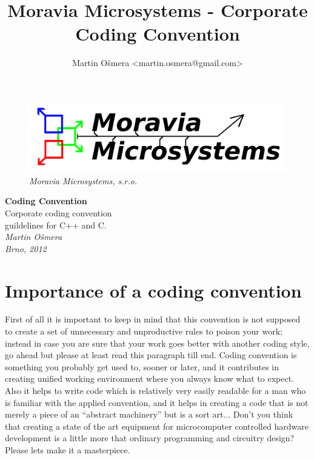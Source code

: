 \documentclass[a4paper,twoside,15pt]{book}
\title{Moravia Microsystems - Corporate Coding Convention}
\author{Martin Ošmera <martin.osmera@gmail.com>}
\begin{document}
\begin{titlepage}
        \begin{figure}[ht!]
                \centering{}
                \includegraphics[width=.9\textwidth]{Moravia_Microsystems.png}
                \caption{\textit{Moravia Microsystems, s.r.o.}}
        \end{figure}
        \begin{center}
                \fontsize{35.83pt}{60pt} \selectfont{}
                \textbf{Coding Convention}
                \\[2cm]
                \fontsize{25pt}{30pt} \selectfont{}
                Corporate coding convention\\
                guildelines for C++ and C.
                \\[1cm]
                \fontsize{14.4pt}{20pt} \selectfont{}
                \textit{Martin Ošmera\\Brno, 2012}
        \end{center}
\end{titlepage}

\tableofcontents

\chapter{Importance of a coding convention}
	First of all it is important to keep in mind that this convention is not supposed to create a set of unnecessary and unproductive rules to poison your work; instead in case you are sure that your work goes better with another coding style, go ahead but please at least read this paragraph till end. Coding convention is something you probably get used to, sooner or later, and it contributes in creating unified working environment where you always know what to expect. Also it helps to write code which is relatively very easily readable for a man who is familiar with the applied convention, and it helps in creating a code that is not merely a piece of an ``abstract machinery'' but is a sort art... Don't you think that creating a state of the art equipment for microcomputer controlled hardware development is a little more that ordinary programming and circuitry design? Please lets make it a masterpiece.
\end{document}
